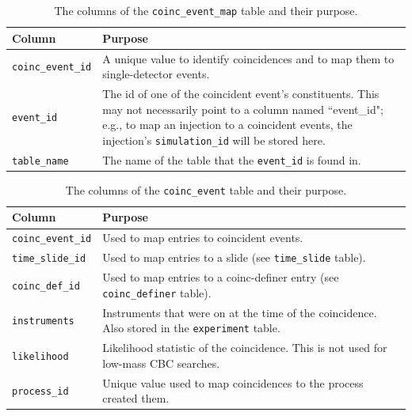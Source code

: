 \begin{table}[p]
\label{tab:coinc_event_map}
\center
\begin{tabular}{l | p{10cm}}
Column      &   Purpose     \\
\hline \hline
\texttt{coinc\_event\_id}   &   A unique value to identify coincidences and to map them to single-detector events. \\
\hline
\texttt{event\_id}  & The id of one of the coincident event's constituents. This may not necessarily point to a column named ``event\_id"; e.g., to map an injection to a coincident events, the injection's \texttt{simulation\_id} will be stored here. \\
\hline
\texttt{table\_name}    &   The name of the table that the \texttt{event\_id} is found in.
\end{tabular}
\caption{The columns of the \texttt{coinc\_event\_map} table and their purpose.}
\end{table}

\begin{table}[p]
\label{tab:coinc_event}
\center
\begin{tabular}{l | p{10cm}}
Column      &   Purpose     \\
\hline \hline
\texttt{coinc\_event\_id}   &   Used to map entries to coincident events. \\
\hline
\texttt{time\_slide\_id}    &   Used to map entries to a slide (see \texttt{time\_slide} table). \\
\hline
\texttt{coinc\_def\_id}     &   Used to map entries to a coinc-definer entry (see \texttt{coinc\_definer} table). \\
\hline
\texttt{instruments}        &   Instruments that were on at the time of the coincidence. Also stored in the \texttt{experiment} table. \\
\hline
\texttt{likelihood}         &   Likelihood statistic of the coincidence. This is not used for low-mass \ac{CBC} searches. \\
\hline
\texttt{process\_id}        &   Unique value used to map coincidences to the process created them.
\end{tabular}
\caption{The columns of the \texttt{coinc\_event} table and their purpose.}
\end{table}

